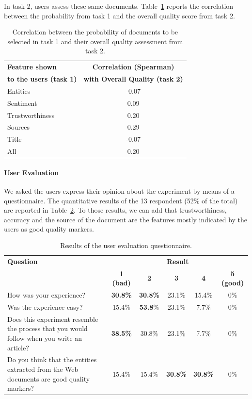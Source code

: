 \documentclass{llncs}
\begin{document}
In task 2, users assess these same documents. Table~\ref{tab:t1t2corrj} reports the correlation between the probability from task 1 and the overall quality score from task 2.

\begin{table}
\centering
\caption{Correlation between the probability of documents to be selected in task 1 and their overall quality assessment from task 2.\label{tab:t1t2corrj}}
\begin{tabular}{|l|c|}
\hline
{\bf Feature shown } & {\bf Correlation (Spearman)}  \\
{\bf to the users (task 1)} & {\bf with Overall Quality (task 2)}\\
\hline
Entities & -0.07 \\ \hline
Sentiment & 0.09 \\ \hline
Trustworthiness & 0.20 \\ \hline
Sources & 0.29 \\ \hline
Title & -0.07 \\ \hline
All & 0.20 \\ \hline
\end{tabular}
\end{table}

\paragraph{User Evaluation}
We asked the users express their opinion about the experiment by means of a questionnaire. The quantitative results of the 13 respondent (52\% of the total) are reported in Table~\ref{tab:questj}. To those results, we can add that trustworthiness, accuracy and the source of the document are the features mostly indicated by the users as good quality markers.

\begin{table}
\centering
\caption{Results of the user evaluation questionnaire.\label{tab:questj}}
\begin{tabular}{|p{6.2cm}|c|c|c|c|c|}
\hline
{\bf Question} & \multicolumn{5}{c|}{\bf Result} \\ \cline{2-6}
& {\bf 1 (bad)} & {\bf 2} & {\bf 3} & {\bf 4} & {\bf 5 (good)} \\ \hline
How was your experience? & {\bf 30.8\%} & {\bf 30.8\%} & 23.1\% & 15.4\% & 0\%\\ \hline
Was the experience easy? & 15.4\% & {\bf 53.8}\% & 23.1\% & 7.7\% & 0\% \\ \hline
Does this experiment resemble the process that you would follow when you write an article? & {\bf 38.5\%} & 30.8\% & 23.1\% & 7.7\% & 0\% \\ \hline
Do you think that the entities extracted from the Web documents are good quality markers? & 15.4\% & 15.4\% & {\bf 30.8\%} & {\bf 30.8\%} &  0\% \\ \hline
\end{tabular}
\end{table}
\end{document}
